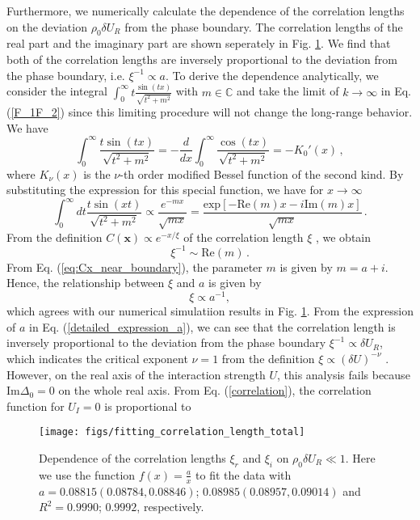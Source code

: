 \documentclass[aps,onecolumn,nofootinbib,superscriptaddress,notitlepage,longbibliography]{revtex4-1}
\begin{document}
Furthermore, we numerically calculate the dependence of the correlation lengths on the deviation
$\rho_{0}\delta U_{R}$ from the phase boundary. The correlation lengths of the real part and the imaginary
part are shown seperately in Fig. \ref{fig3}. We find that both of the correlation lengths are inversely proportional to the deviation from the phase boundary, i.e. $\xi^{-1}\propto a$. To derive the dependence analytically, we consider the integral $\int_0^{\infty}t\frac{\sin(tx)}{\sqrt{t^2+m^2}}$ with $m\in\mathbb{C}$ and take the limit of $k\to\infty$ in Eq. (\ref{F_1F_2}) since this limiting procedure will not change the long-range behavior. We have
\begin{equation}
   \int_0^{\infty}\frac{t\sin(tx)}{\sqrt{t^2+m^2}}=-\frac{d}{dx}\int_0^{\infty}\frac{\cos(tx)}{\sqrt{t^2+m^2}}=-K_0'(x)\,,
\end{equation}
where $K_{\nu}(x)$ is the $\nu$-th order modified Bessel function of the second kind. By substituting the expression for this special function, we have for $x\rightarrow\infty$
\begin{equation}
\int_{0}^{\infty}dt\frac{t\sin(xt)}{\sqrt{t^{2}+m^{2}}}\propto \frac{e^{-mx}}{\sqrt{mx}}= \frac{\text{exp}[-\text{Re}(m)x-i\text{Im}(m)x]}{\sqrt{mx}}\,.
\end{equation}
From the definition $C(\bm{x})\propto e^{-x/\xi}$ of the correlation length $\xi$ \cite{Sachdev:2011uj}, we obtain
\begin{equation}
    \xi^{-1}\sim\text{Re}(m)\,.
\end{equation}
From Eq. (\ref{eq:Cx_near_boundary}), the parameter $m$ is given by $m=a+i$. Hence, the relationship between $\xi$ and $a$ is given by
\begin{equation}
  \xi\propto a^{-1},\label{corre_length}
\end{equation}
which agrees with our numerical simulatiion results in Fig. \ref{fig3}. From the expression of $a$ in Eq. (\ref{detailed_expression_a}), we can see that the correlation length is inversely proportional to the deviation from the phase boundary $\xi^{-1}\propto\delta U_R$, which indicates the critical exponent $\nu=1$ from the definition $\xi\propto(\delta U)^{-\nu}$ \cite{Sachdev:2011uj}. However, on the real axis of the interaction strength $U$, this analysis fails because $\text{Im}\Delta_0=0$ on the whole real axis. From Eq. (\ref{correlation}),  the correlation function for $U_I=0$ is proportional to
\begin{figure}
	\centering \texttt{[image: figs/fitting\_correlation\_length\_total]}
	\caption{Dependence of the correlation lengths $\xi_r$ and $\xi_i$ on $\rho_{0}\delta U_{R}\ll1$. Here we use the function $f(x)=\frac{a}{x}$ to fit the data with
		$a=0.08815(0.08784,0.08846)$; $0.08985(0.08957,0.09014)$ and $R^{2}=0.9990$;
		$0.9992$, respectively.}
	\label{fig3}
\end{figure}
\end{document}
